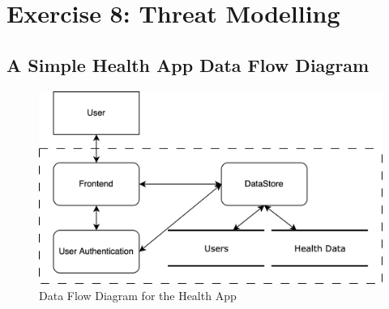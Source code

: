 \section{Exercise 8: Threat Modelling}
\subsection{A Simple Health App Data Flow Diagram}
\begin{figure}[H]
  \caption{Data Flow Diagram for the Health App}
  \vspace*{1em}
  \begin{center}
    \includegraphics[width=\textwidth]{Diagrams/threat-modelling-1.png}
  \end{center}
\end{figure}
